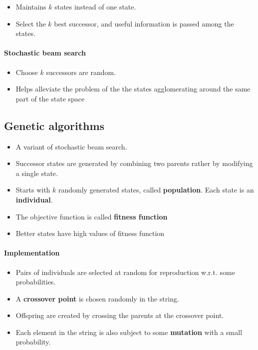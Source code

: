 \begin{itemize}
  \item Maintains $k$ states instead of one state.
  \item Select the $k$ best successor, and useful information is
    passed among the states.
\end{itemize}

\paragraph{Stochastic beam search}
\begin{itemize}
  \item Choose $k$ successors are random.
  \item Helps alleviate the problem of the the states
    agglomerating around the same part of the state space
\end{itemize}

\subsection{Genetic algorithms}

\begin{itemize}
  \item A variant of stochastic beam search.
  \item Successor states are generated by combining two parents
    rather by modifying a single state.
  \item Starts with $k$ randomly generated states, called
    \textbf{population}. Each state is an \textbf{individual}.
  \item The objective function is called \textbf{fitness
    function}
  \item Better states have high values of fitness function
\end{itemize}

\paragraph{Implementation}
\begin{itemize}
  \item Pairs of individuals are selected at random for
    reproduction w.r.t. some probabilities.
  \item A \textbf{crossover point} is chosen randomly in the string.
  \item Offspring are created by crossing the parents at the
    crossover point.
  \item Each element in the string is also subject to some
    \textbf{mutation} with a small probability.
\end{itemize}
